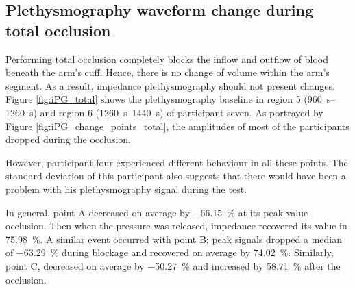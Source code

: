 \subsection{Plethysmography waveform change during total occlusion}
\label{section results 3.3}
Performing total occlusion completely blocks the inflow and outflow of blood beneath the arm's cuff.  Hence, there is no change of volume within the arm's segment. As a result, impedance plethysmography should not present changes.  Figure \ref{fig:iPG_total} shows the plethysmography baseline in region 5 (\SIrange{960}{1260}{\second}) and region 6  (\SIrange{1260}{1440}{\second}) of participant seven. As portrayed by Figure \ref{fig:iPG_change_points_total}, the amplitudes of most of the participants dropped during the occlusion.

However, participant four experienced different behaviour in all these points. The standard deviation of this participant also suggests that there would have been a problem with his plethysmography signal during the test. 

In general, point A decreased on average by \SI{-66.15}{\percent} at its peak value occlusion. Then when the pressure was released, impedance recovered its value in \SI{75.98}{\percent}. A similar event occurred with point B; peak signals dropped a median of \SI{-63.29}{\percent} during blockage and recovered on average by \SI{74.02}{\percent}. Similarly, point C, decreased on average by \SI{-50.27}{\percent}  and increased by \SI{58.71}{\percent} after the occlusion.


